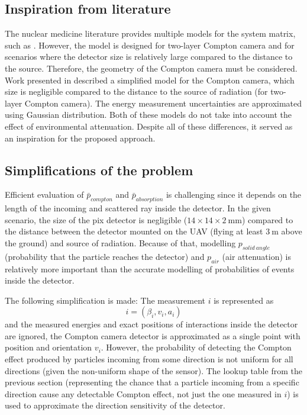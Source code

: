 \subsection{Inspiration from literature}
The nuclear medicine literature provides multiple models for the system matrix, such as \cite{wilderman}. 
However, the model is designed for two-layer Compton camera and for scenarios where the detector size is relatively large compared to the distance to the source. Therefore, the geometry of the Compton camera must be considered.
Work presented in \cite{maxim2016} described a simplified model for the Compton camera, which size is negligible compared to the distance to the source of radiation (for two-layer Compton camera).
The energy measurement uncertainties are approximated using Gaussian distribution.
Both of these models do not take into account the effect of environmental attenuation.
Despite all of these differences, it served as an inspiration for the proposed approach.

\subsection{Simplifications of the problem}
Efficient evaluation of $\bar{p}_{compton}$ and $\bar{p}_{absorption}$ is challenging since it depends on the length of the incoming and scattered ray inside the detector.
In the given scenario, the size of the \ac{pix} detector is negligible ($14 \times 14 \times 2 \ \mathrm{mm}$) compared to the distance between the detector mounted on the \ac{UAV} (flying at least $\SI{3}\meter$ above the ground) and source of radiation.
Because of that, modelling $p_{solid\ angle}$ (probability that the particle reaches the detector) and $p_{air}$ (air attenuation) is relatively more important than the accurate modelling of probabilities of events inside the detector.

The following simplification is made:
The measurement $i$ is represented as
\begin{equation}
  i = (\beta_{i}, v_{i}, a_{i})
\end{equation}
and the measured energies and exact positions of interactions inside the detector are ignored,
the Compton camera detector is approximated as a single point with position and orientation $v_{i}$.
However, the probability of detecting the Compton effect produced by particles incoming from some direction is not uniform for all directions (given the non-uniform shape of the sensor).
The lookup table from the previous section (representing the chance that a particle incoming from a specific direction cause any detectable Compton effect, not just the one measured in $i$) is used to approximate the direction sensitivity of the detector.

